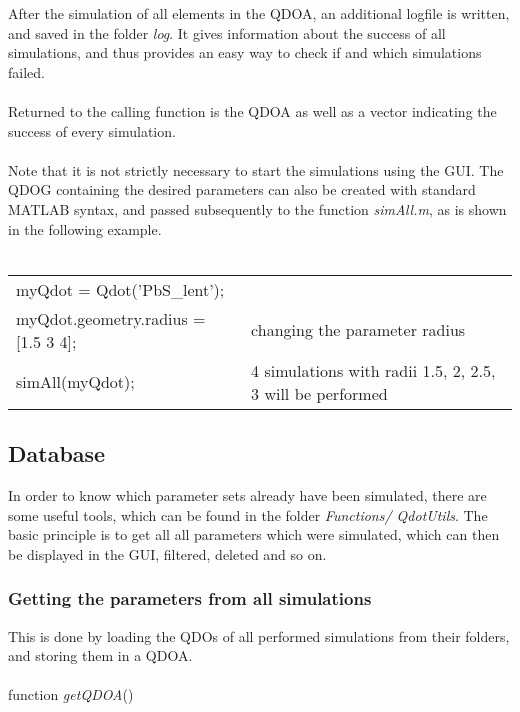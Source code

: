 After the simulation of all elements in the QDOA, an additional logfile is written, and saved in the folder \textit{log}. It gives information about the success of all simulations, and thus provides an easy way to check if and which simulations failed.
\\\\
Returned to the calling function is the QDOA as well as a vector indicating the success of every simulation.
\\\\
Note that it is not strictly necessary to start the simulations using the GUI. The QDOG containing the desired parameters can also be created with standard MATLAB syntax, and passed subsequently to the function \textit{simAll.m}, as is shown in the following example.\\
\\
\begin{EXAMPLE} \end{EXAMPLE}
\begin{tabular}{ll}
myQdot = Qdot('PbS\_lent'); &  \\
myQdot.geometry.radius = [1.5 3 4]; 	& changing the parameter radius\\
simAll(myQdot); & 4 simulations with radii 1.5, 2, 2.5, 3 will be performed\\
\end{tabular} 




\subsection{Database}

In order to know which parameter sets already have been simulated, there are some useful tools, which can be found in the folder \textit{Functions/
QdotUtils}. The basic principle is to get all all parameters which were simulated, which can then be displayed in the GUI, filtered, deleted and so on.

\subsubsection{Getting the parameters from all simulations}
This is done by loading the QDOs of all performed simulations from their folders, and storing them in a QDOA. \\\\
function \textit{getQDOA}()

